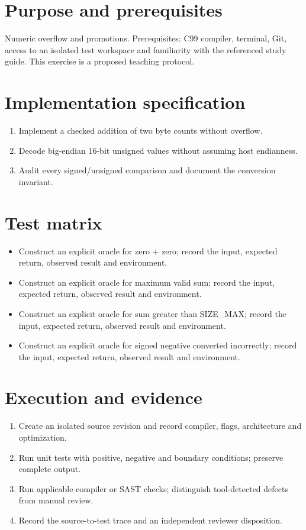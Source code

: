 \documentclass[10pt,letterpaper]{article}
\begin{document}
\makedoctitle
\makedocsummary
\section{Purpose and prerequisites}
Numeric overflow and promotions. Prerequisites: C99 compiler, terminal, Git, access to an isolated test workspace and familiarity with the referenced study guide. This exercise is a proposed teaching protocol.
\section{Implementation specification}
\begin{enumerate}
\item Implement a checked addition of two byte counts without overflow.
\item Decode big-endian 16-bit unsigned values without assuming host endianness.
\item Audit every signed/unsigned comparison and document the conversion invariant.
\end{enumerate}

\section{Test matrix}
\begin{itemize}
\item Construct an explicit oracle for zero + zero; record the input, expected return, observed result and environment.
\item Construct an explicit oracle for maximum valid sum; record the input, expected return, observed result and environment.
\item Construct an explicit oracle for sum greater than SIZE\_MAX; record the input, expected return, observed result and environment.
\item Construct an explicit oracle for signed negative converted incorrectly; record the input, expected return, observed result and environment.
\end{itemize}

\section{Execution and evidence}
\begin{enumerate}
\item Create an isolated source revision and record compiler, flags, architecture and optimization.
\item Run unit tests with positive, negative and boundary conditions; preserve complete output.
\item Run applicable compiler or SAST checks; distinguish tool-detected defects from manual review.
\item Record the source-to-test trace and an independent reviewer disposition.
\end{enumerate}
\end{document}
